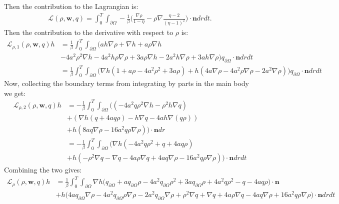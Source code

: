 \documentclass[11pt, a4paper]{article}
\theoremstyle{definition}
\newcommand{\w}{\mathbf{w}}
\newcommand{\n}{\mathbf{n}}
\begin{document}
Then the contribution to the Lagrangian is:
\begin{align*}
\mathcal{L}(\rho, \w, q) = \int_0^T \int_{\partial \Omega} -\frac{1}{\beta} \bigg(  \frac{\nabla \rho}{1 - \eta}  - \rho \nabla\frac{\eta - 2}{(\eta - 1)^2}  \bigg)\cdot \n dr dt.
\end{align*}
Then the contribution to the derivative with respect to $\rho$ is:
\begin{align*}
\mathcal{L}_{\rho,1} (\rho, \w, q)h &= \frac{1}{\beta} \int_0^T \int_{\partial \Omega} \bigg(ah \nabla \rho + \nabla h + a \rho \nabla h \\
& -4a^2 \rho^2 \nabla h - 4a^2 h \rho \nabla \rho + 3a \rho \nabla h - 2a^2 h \nabla \rho + 3a h \nabla \rho \bigg) q_{\partial \Omega} \cdot \n  dr dt\\
&= \frac{1}{\beta} \int_0^T \int_{\partial \Omega} \bigg( \nabla h( 1 + a\rho - 4a^2 \rho^2 + 3a \rho) +h(4a \nabla \rho -4a^2 \rho \nabla \rho -2a^2 \nabla \rho )\bigg) q_{\partial \Omega} \cdot \n dr dt
\end{align*}
Now, collecting the boundary terms from integrating by parts in the main body we get:
\begin{align*}
\mathcal{L}_{\rho,2} (\rho, \w, q)h&=- \frac{1}{\beta}\int_0^T \int_{\partial \Omega} \bigg((-4a^2 q\rho^2 \nabla h - \rho^2 h \nabla q )\\
&+(\nabla h (q+ 4aq\rho) -h \nabla q - 4ah \nabla (q \rho))\\
&+h(8aq \nabla \rho - 16a^2 q \rho \nabla \rho) \bigg) \cdot \n dr \\
&= - \frac{1}{\beta}\int_0^T \int_{\partial \Omega} \bigg(\nabla h (- 4a^2 q \rho^2 +q + 4aq\rho)\\
&+ h(- \rho^2 \nabla q - \nabla q -4a\rho\nabla q  + 4a q\nabla \rho - 16a^2 q \rho \nabla \rho) \bigg) \cdot \n dr dt
\end{align*}
Combining the two gives:
\begin{align*}
\mathcal{L}_{\rho} (\rho, \w, q)h &= \frac{1}{\beta} \int_0^T \int_{\partial \Omega} \nabla h \bigg(  q_{\partial \Omega} + aq_{\partial \Omega}\rho - 4a^2q_{\partial \Omega} \rho^2 + 3a q_{\partial \Omega}\rho + 4a^2 q \rho^2 -q - 4aq\rho \bigg) \cdot \n\\
&+ h \bigg(  4a q_{\partial \Omega}\nabla \rho -4a^2 q_{\partial \Omega}\rho \nabla \rho -2a^2q_{\partial \Omega} \nabla \rho             
+\rho^2 \nabla q + \nabla q +4a\rho\nabla q  - 4a q\nabla \rho + 16a^2 q \rho \nabla \rho\bigg) \cdot \n dr dt
\end{align*}
\end{document}
